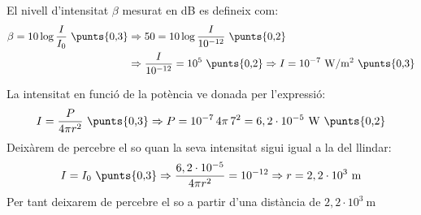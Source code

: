 \begin{solapartat}
El nivell d'intensitat $\beta$ mesurat en dB es defineix com:
\begin{align*}
\beta = 10\log\frac{I}{I_0} \ \text{\punts{0,3}} &\Rightarrow 50 = 10\log\frac{I}{10^{-12}} \ \text{\punts{0,2}}\\
&\Rightarrow \frac{I}{10^{-12}} = 10^{5} \ \text{\punts{0,2}} \Rightarrow I = 10^{-7}\ \mathrm{W/m^2} \ \text{\punts{0,3}}
\end{align*}
\end{solapartat}

\begin{solapartat}
La intensitat en funció de la potència ve donada per l'expressió:
\[ I = \frac{P}{4\pi r^2} \ \text{\punts{0,3}} \Rightarrow P = 10^{-7}\,4\pi\,7^2 = 6,2\cdot 10^{-5}\ \mathrm{W} \ \text{\punts{0,2}} \]
Deixàrem de percebre el so quan la seva intensitat sigui igual a la del llindar:
\[ I = I_0 \ \text{\punts{0,3}} \Rightarrow \frac{6,2\cdot 10^{-5}}{4\pi r^2} = 10^{-12} \Rightarrow r = 2,2\cdot 10^{3}\ \mathrm{m} \]
Per tant deixarem de percebre el so a partir d'una distància de $2,2\cdot 10^{3}\ \mathrm{m}$ 
\end{solapartat}
